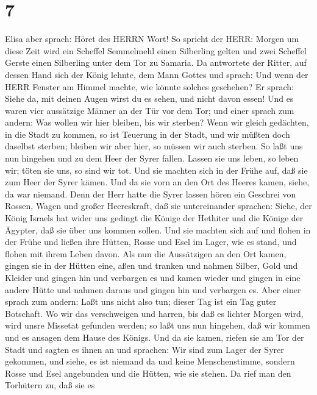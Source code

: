 \hypertarget{section-6}{%
\section{7}\label{section-6}}

 Elisa aber sprach: Höret des HERRN Wort! So spricht der
HERR: Morgen um diese Zeit wird ein Scheffel Semmelmehl einen Silberling
gelten und zwei Scheffel Gerste einen Silberling unter dem Tor zu
Samaria.  Da antwortete der Ritter, auf dessen Hand sich der
König lehnte, dem Mann Gottes und sprach: Und wenn der HERR Fenster am
Himmel machte, wie könnte solches geschehen? Er sprach: Siehe da, mit
deinen Augen wirst du es sehen, und nicht davon essen!  Und
es waren vier aussätzige Männer an der Tür vor dem Tor; und einer sprach
zum andern: Was wollen wir hier bleiben, bis wir sterben? 
Wenn wir gleich gedächten, in die Stadt zu kommen, so ist Teuerung in
der Stadt, und wir müßten doch daselbst sterben; bleiben wir aber hier,
so müssen wir auch sterben. So laßt uns nun hingehen und zu dem Heer der
Syrer fallen. Lassen sie uns leben, so leben wir; töten sie uns, so sind
wir tot.  Und sie machten sich in der Frühe auf, daß sie zum
Heer der Syrer kämen. Und da sie vorn an den Ort des Heeres kamen,
siehe, da war niemand.  Denn der Herr hatte die Syrer lassen
hören ein Geschrei von Rossen, Wagen und großer Heereskraft, daß sie
untereinander sprachen: Siehe, der König Israels hat wider uns gedingt
die Könige der Hethiter und die Könige der Ägypter, daß sie über uns
kommen sollen.  Und sie machten sich auf und flohen in der
Frühe und ließen ihre Hütten, Rosse und Esel im Lager, wie es stand, und
flohen mit ihrem Leben davon.  Als nun die Aussätzigen an
den Ort kamen, gingen sie in der Hütten eine, aßen und tranken und
nahmen Silber, Gold und Kleider und gingen hin und verbargen es und
kamen wieder und gingen in eine andere Hütte und nahmen daraus und
gingen hin und verbargen es.  Aber einer sprach zum andern:
Laßt uns nicht also tun; dieser Tag ist ein Tag guter Botschaft. Wo wir
das verschweigen und harren, bis daß es lichter Morgen wird, wird unsre
Missetat gefunden werden; so laßt uns nun hingehen, daß wir kommen und
es ansagen dem Hause des Königs.  Und da sie kamen, riefen
sie am Tor der Stadt und sagten es ihnen an und sprachen: Wir sind zum
Lager der Syrer gekommen, und siehe, es ist niemand da und keine
Menschenstimme, sondern Rosse und Esel angebunden und die Hütten, wie
sie stehen.  Da rief man den Torhütern zu, daß sie es
